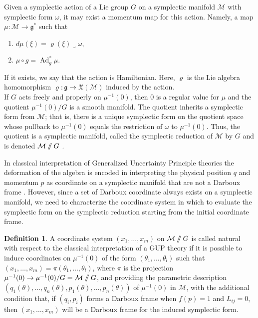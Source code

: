 \documentclass{article}
\numberwithin{equation}{section}
\theoremstyle{definition}
\newtheorem{definition}[theorem]{Definition}
\newcommand{\g}{\mathfrak{g}}
\newcommand{\M}{\mathcal{M}}
\newcommand{\Ad}{\operatorname{Ad}}
\newcommand{\inn}{\operatorname{\lrcorner}}
\newcommand{\sslash}{\mathbin{/\mkern-6mu/}}
\begin{document}
Given a symplectic action of a Lie group $G$ on a symplectic manifold $\M$ with symplectic form $\omega$, it may exist a momentum map for this action. Namely, a map $\mu:\M\to \g^*$ such that
\begin{enumerate}
    \item $d\mu(\xi)=\varrho(\xi)\inn\omega$,
    \item $\mu\circ g=\Ad^*_g\mu$.
\end{enumerate}
If it exists, we say that the action is Hamiltonian. Here, $\varrho$ is the Lie algebra homomorphism $\varrho:\g\to\mathfrak{X}(\M)$ induced by the action.\\
If $G$ acts freely and properly on $\mu^{-1}(0)$, then $0$ is a regular value for $\mu$ and the quotient $\mu^{-1}(0)/G$ is a smooth manifold. The quotient inherits a symplectic form from $\M$; that is, there is a unique symplectic form on the quotient space whose pullback to $\mu ^{-1}(0)$ equals the restriction of $\omega$ to $\mu ^{-1}(0)$. Thus, the quotient is a symplectic manifold, called the symplectic reduction of $\M$ by $G$ and is denoted $\M\sslash G$ \cite{Marsden_Weinstein_1974}.

\medskip

In classical interpretation of Generalized Uncertainty Principle theories the deformation of the algebra is encoded in interpreting the physical position $q$ and momentum $p$ as coordinate on a symplectic manifold that are not a Darboux frame \cite{Bruno_Segreto_2024}. However, since a set of Darboux coordinate always exists on a symplectic manifold, we need to characterize the coordinate system in which to evaluate the symplectic form on the symplectic reduction starting from the initial coordinate frame.
\begin{definition}
    A coordinate system $(x_1,\dots,x_m)$ on $\M\sslash G$ is called natural with respect to the classical interpretation of a GUP theory if it is possible to induce coordinates on $\mu^{-1}(0)$ of the form $(\theta_1,\dots,\theta_l)$ such that $(x_1,\dots,x_m)=\pi(\theta_1,\dots,\theta_l)$, where $\pi$ is the projection $\mu^{-1}(0)\to\mu^{-1}(0)/G=\M\sslash G$, and providing the parametric description $\left(q_1(\theta),\dots,q_n(\theta),p_1(\theta),\dots,p_n(\theta)\right)$ of $\mu^{-1}(0)$ in $\M$, with the additional condition that, if $(q_i,p_i)$ forms a Darboux frame when $f(p)=1$ and $L_{ij}=0$, then $(x_1,\dots,x_m)$ will be a Darboux frame for the induced symplectic form.
\end{definition}
\end{document}
